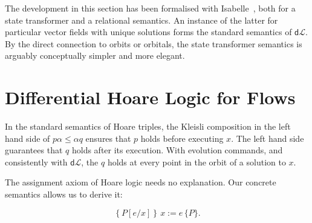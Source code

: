 \documentclass[envcountsame,envcountsect]{llncs}
\newcommand{\dL}{\mathsf{d}\mathcal{L}}
\newcommand{\seq}{\mathop{\,;\,}}
\begin{document}
The development in this section has been formalised with
Isabelle~\cite{afp:hybrid}, both for a state transformer and a
relational semantics. An instance of the latter for particular vector
fields with unique solutions forms the standard semantics of
$\dL$. By the direct connection to orbits or orbitals, the state
transformer semantics is arguably conceptually simpler and more
elegant.



\section{Differential Hoare Logic for Flows}\label{sec:hoare-flow}

In the standard semantics of Hoare triples, the Kleisli composition in
the left hand side of $p\alpha\le \alpha q$ ensures that $p$ holds
before executing $x$. The left hand side guarantees that $q$ holds
after its execution. With evolution commands, and consistently with
$\dL$, the $q$ holds at every point in the orbit of a
solution to $x$.

The assignment axiom of Hoare logic needs no explanation. Our concrete
semantics allows us to derive it:

\begin{equation}
\left\{P[e/x]\right\}\,  x:=e\, \{P\}. \label{eq:h-assgn}\tag{h-assgn}
\end{equation}

\end{document}
